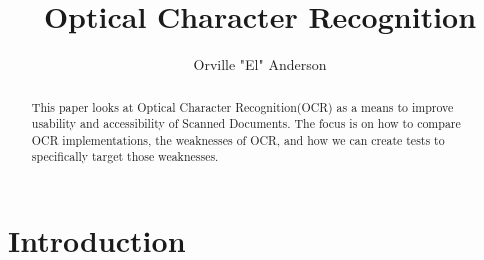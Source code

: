 \documentclass[sigplan,screen,nonacm]{acmart}
\begin{document}
\title{Optical Character Recognition}

\author{Orville "El" Anderson}


\begin{abstract}

This paper looks at Optical Character Recognition(OCR) as a means to improve usability and accessibility of Scanned Documents. The focus is on how to compare OCR implementations, the weaknesses of OCR, and how we can create tests to specifically target those weaknesses.

\end{abstract}

\doclicenseThis



\maketitle

\section{Introduction}
\label{sec:introduction}
\end{document}
